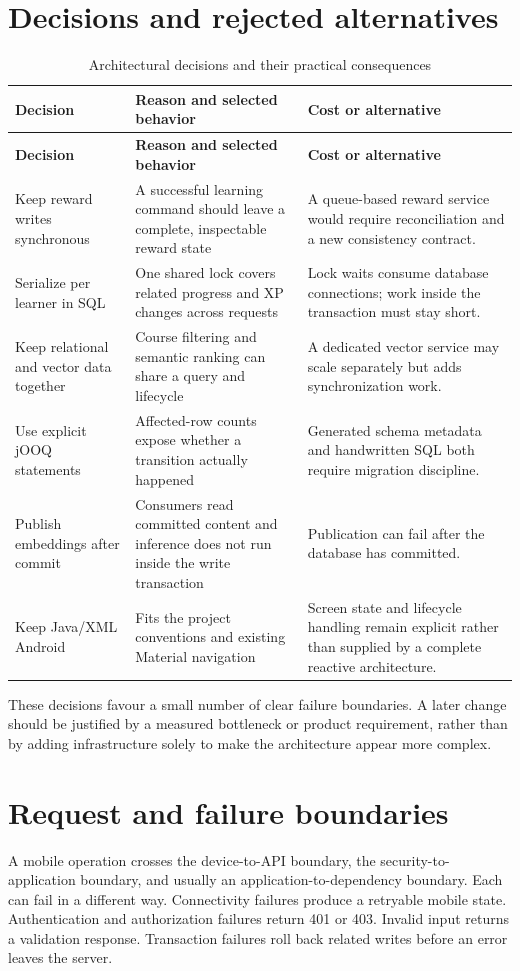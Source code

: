 \documentclass[12pt,a4paper,oneside]{report}
\begin{document}
\section{Decisions and rejected alternatives}
\begin{longtable}{P{0.23\textwidth}P{0.35\textwidth}P{0.31\textwidth}}
\caption{Architectural decisions and their practical consequences}\\\toprule
\textbf{Decision} & \textbf{Reason and selected behavior} & \textbf{Cost or alternative}\\\midrule\endfirsthead
\toprule\textbf{Decision} & \textbf{Reason and selected behavior} & \textbf{Cost or alternative}\\\midrule\endhead
Keep reward writes synchronous & A successful learning command should leave a complete, inspectable reward state & A queue-based reward service would require reconciliation and a new consistency contract.\\
Serialize per learner in SQL & One shared lock covers related progress and XP changes across requests & Lock waits consume database connections; work inside the transaction must stay short.\\
Keep relational and vector data together & Course filtering and semantic ranking can share a query and lifecycle & A dedicated vector service may scale separately but adds synchronization work.\\
Use explicit jOOQ statements & Affected-row counts expose whether a transition actually happened & Generated schema metadata and handwritten SQL both require migration discipline.\\
Publish embeddings after commit & Consumers read committed content and inference does not run inside the write transaction & Publication can fail after the database has committed.\\
Keep Java/XML Android & Fits the project conventions and existing Material navigation & Screen state and lifecycle handling remain explicit rather than supplied by a complete reactive architecture.\\
\bottomrule
\end{longtable}

These decisions favour a small number of clear failure boundaries. A later change
should be justified by a measured bottleneck or product requirement, rather than by
adding infrastructure solely to make the architecture appear more complex.

\section{Request and failure boundaries}
A mobile operation crosses the device-to-API boundary, the security-to-application
boundary, and usually an application-to-dependency boundary. Each can fail in a
different way. Connectivity failures produce a retryable mobile state. Authentication
and authorization failures return 401 or 403. Invalid input returns a validation
response. Transaction failures roll back related writes before an error leaves the
server.
\end{document}
